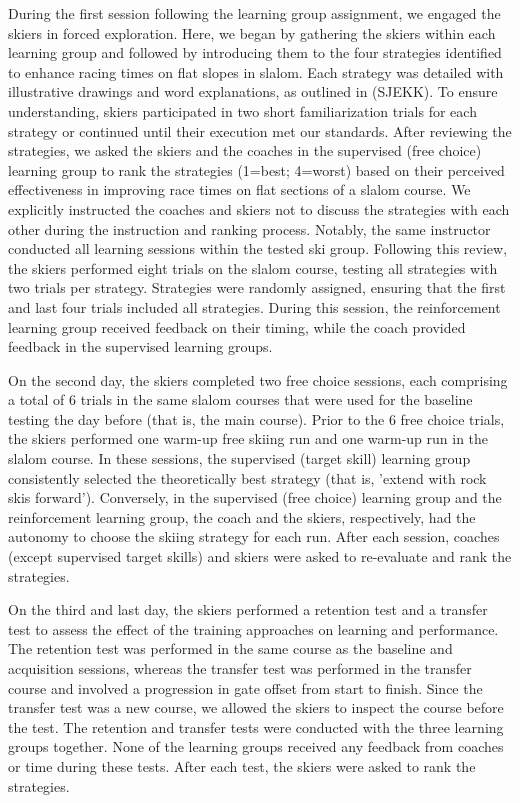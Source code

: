 During the first session following the learning group assignment, we engaged the skiers in forced exploration. Here, we began by gathering the skiers within each learning group and followed by introducing them to the four strategies identified to enhance racing times on flat slopes in slalom. Each strategy was detailed with illustrative drawings and word explanations, as outlined in (SJEKK). To ensure understanding, skiers participated in two short familiarization trials for each strategy or continued until their execution met our standards. After reviewing the strategies, we asked the skiers and the coaches in the supervised (free choice) learning group to rank the strategies (1=best; 4=worst) based on their perceived effectiveness in improving race times on flat sections of a slalom course. We explicitly instructed the coaches and skiers not to discuss the strategies with each other during the instruction and ranking process. Notably, the same instructor conducted all learning sessions within the tested ski group. Following this review, the skiers performed eight trials on the slalom course, testing all strategies with two trials per strategy. Strategies were randomly assigned, ensuring that the first and last four trials included all strategies. During this session, the reinforcement learning group received feedback on their timing, while the coach provided feedback in the supervised learning groups.

On the second day, the skiers completed two free choice sessions, each comprising a total of 6 trials in the same slalom courses that were used for the baseline testing the day before (that is, the main course). Prior to the 6 free choice trials, the skiers performed one warm-up free skiing run and one warm-up run in the slalom course. In these sessions, the supervised (target skill) learning group consistently selected the theoretically best strategy (that is, 'extend with rock skis forward'). Conversely, in the supervised (free choice) learning group and the reinforcement learning group, the coach and the skiers, respectively, had the autonomy to choose the skiing strategy for each run. After each session, coaches (except supervised target skills) and skiers were asked to re-evaluate and rank the strategies.

On the third and last day, the skiers performed a retention test and a transfer test to assess the effect of the training approaches on learning and performance. The retention test was performed in the same course as the baseline and acquisition sessions, whereas the transfer test was performed in the transfer course and involved a progression in gate offset from start to finish. Since the transfer test was a new course, we allowed the skiers to inspect the course before the test. The retention and transfer tests were conducted with the three learning groups together. None of the learning groups received any feedback from coaches or time during these tests. After each test, the skiers were asked to rank the strategies.








